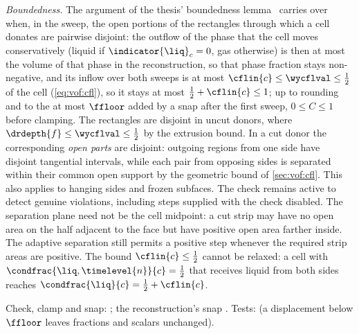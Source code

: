\emph{Boundedness.}\label{prop:vof:boundedness} The
argument of the thesis' boundedness lemma~ carries over when,
in the sweep, the open portions of the rectangles through which a cell
donates are pairwise disjoint: the outflow of the phase that the cell moves
conservatively (liquid if $\indicator{\liq}_c=0$, gas otherwise) is then at
most the volume of that phase in the reconstruction, so that phase fraction
stays non-negative, and its inflow over both sweeps is at most
$\cflin{c}\le\wycflval\le\half$ of the cell (\cref{eq:vof:cfl}), so it stays
at most $\half+\cflin{c}\le1$; up to rounding and to the at most $\ffloor$ added
by a snap after the first sweep, $0\le C\le1$ before clamping. The
rectangles are disjoint in uncut donors, where $\drdepth{f}\le\wycflval\le\half$
by the extrusion bound. In a cut donor the corresponding \emph{open parts}
are disjoint: outgoing regions from one side have disjoint tangential
intervals, while each pair from opposing sides is separated within their
common open support by the geometric bound of \cref{sec:vof:cfl}. This also
applies to hanging sides and frozen subfaces. The check remains active to
detect genuine violations, including steps supplied with the check disabled.
\label{ex:vof:depth-triangle}The separation plane need not be
the cell midpoint: a cut strip may have no open area on the half adjacent to
the face but have positive open area farther inside. The adaptive separation
still permits a positive step whenever the required strip areas are positive.
The bound $\cflin{c}\le\half$ cannot be relaxed: a cell with
$\condfrac{\liq,\timelevel{n}}{c}=\half$ that receives liquid from both sides
reaches $\condfrac{\liq}{c}=\half+\cflin{c}$.

\begin{implnote}
Check, clamp and snap: ; the
reconstruction's snap .
Tests:  (a
displacement below $\ffloor$ leaves fractions and scalars unchanged).
\end{implnote}


